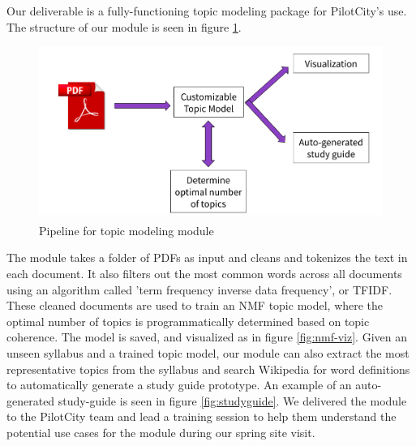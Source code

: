 Our deliverable is a fully-functioning topic modeling package for PilotCity's use. The structure of our module is seen in figure \ref{fig:pipeline}. 
\begin{figure}[H]
    \centering
    \includegraphics[scale=0.35]{module-pipeline.png}
    \caption{Pipeline for topic modeling module}
    \label{fig:pipeline}
\end{figure}
The module takes a folder of PDFs as input and cleans and tokenizes the text in each document. It also filters out the most common words across all documents using an algorithm called 'term frequency inverse data frequency', or TFIDF. These cleaned documents are used to train an NMF topic model, where the optimal number of topics is programmatically determined based on topic coherence. The model is saved, and visualized as in figure \ref{fig:nmf-viz}. 
Given an unseen syllabus and a trained topic model, our module can also extract the most representative topics from the syllabus and search Wikipedia for word definitions to automatically generate a study guide prototype. An example of an auto-generated study-guide is seen in figure \ref{fig:studyguide}.
We delivered the module to the PilotCity team and lead a training session to help them understand the potential use cases for the module during our spring site visit. 

